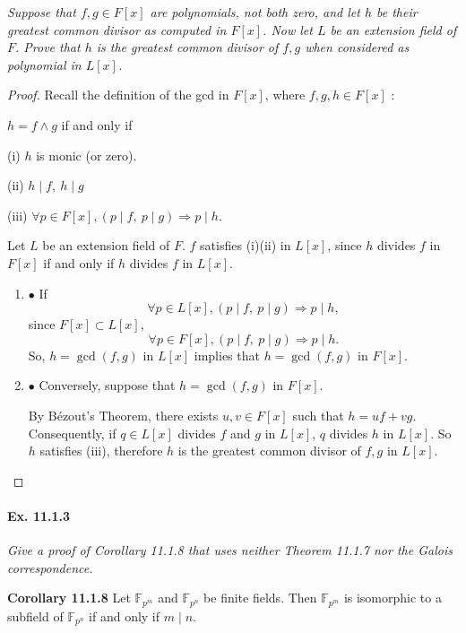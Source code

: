 \documentclass[11pt,a4paper]{article}
\newcommand{\be} {\begin{enumerate}}
\newcommand{\ee} {\end{enumerate}}
\newcommand{\F}{\mathbb{F}}
\begin{document}
{\it Suppose that $f,g \in F[x]$ are polynomials, not both zero, and let $h$ be their greatest common divisor as computed in $F[x]$. Now let $L$ be an extension field of $F$. Prove that $h$ is the greatest common divisor of $f,g$ when considered as polynomial in $L[x]$.
}

\begin{proof}
Recall the definition of the gcd in $F[x]$, where $f,g,h \in F[x]$ : 

$h = f\wedge g$ if and only if

(i) $h$ is monic (or zero).

(ii) $h \mid f,\  h \mid g$

(iii) $\forall p \in F[x], (p \mid f,\  p \mid g) \Rightarrow p \mid h$.

Let $L$ be an extension field of $F$. $f$ satisfies (i)(ii) in $L[x]$, since $h$ divides $f$ in $F[x]$ if and only if $h$ divides $f$ in $L[x]$.

\be 
\item[$\bullet$] If
$$\forall p \in L[x], (p \mid f,\  p \mid g) \Rightarrow p \mid h,$$
since $F[x] \subset L[x]$,
$$\forall p \in F[x], (p \mid f,\  p \mid g) \Rightarrow p \mid h.$$
So, $h = \gcd(f,g)$ in $L[x]$ implies that $h = \gcd(f,g)$ in $F[x]$.

\item[$\bullet$] Conversely, suppose that $h = \gcd(f,g)$ in $F[x]$.

By B\'ezout's Theorem, there exists $u,v \in F[x]$ such that $h = uf +vg$. Consequently, if $q \in L[x]$ divides $f$ and $g$ in $L[x]$, $q$ divides $h$ in $L[x]$. So $h$ satisfies (iii), therefore $h$ is the greatest common divisor of $f,g$ in $L[x]$.
\ee
\end{proof}

\paragraph{Ex. 11.1.3}

{\it Give a proof of Corollary 11.1.8 that uses neither Theorem 11.1.7 nor the Galois correspondence.

\medskip

{\bf Corollary 11.1.8} Let $\F_{p^m}$ and $\F_{p^n}$ be finite fields. Then $\F_{p^m}$ is isomorphic to a subfield of $\F_{p^n}$ if and only if $m\mid n$.
}
\end{document}
